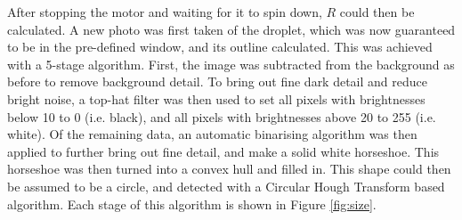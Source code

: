\documentclass{physics_article_B}
\begin{document}
            After stopping the motor and waiting for it to spin down, $R$ could then be calculated. A new photo was first taken of the droplet, which was now guaranteed to be in the pre-defined window, and its outline calculated. This was achieved with a 5-stage algorithm. First, the image was subtracted from the background as before to remove background detail. To bring out fine dark detail and reduce bright noise, a top-hat filter was then used to set all pixels with brightnesses below 10 to 0 (i.e. black), and all pixels with brightnesses above 20 to 255 (i.e. white). Of the remaining data, an automatic binarising algorithm was then applied to further bring out fine detail, and make a solid white horseshoe. This horseshoe was then turned into a convex hull and filled in. This shape could then be assumed to be a circle, and detected with a Circular Hough Transform based algorithm\cite{imfindcircles}. Each stage of this algorithm is shown in Figure \ref{fig:size}.
            
\end{document}
